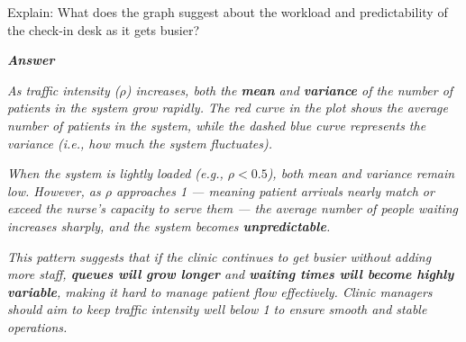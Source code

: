 \documentclass[
]{article}
\begin{document}
Explain: What does the graph suggest about the workload and
predictability of the check-in desk as it gets busier?

\textbf{\emph{Answer}}

\emph{As traffic intensity (\(\rho\)) increases, both the \textbf{mean}
and \textbf{variance} of the number of patients in the system grow
rapidly. The red curve in the plot shows the average number of patients
in the system, while the dashed blue curve represents the variance
(i.e., how much the system fluctuates).}

\emph{When the system is lightly loaded (e.g., \(\rho < 0.5\)), both
mean and variance remain low. However, as \(\rho\) approaches 1 ---
meaning patient arrivals nearly match or exceed the nurse's capacity to
serve them --- the average number of people waiting increases sharply,
and the system becomes \textbf{unpredictable}.}

\emph{This pattern suggests that if the clinic continues to get busier
without adding more staff, \textbf{queues will grow longer} and
\textbf{waiting times will become highly variable}, making it hard to
manage patient flow effectively. Clinic managers should aim to keep
traffic intensity well below 1 to ensure smooth and stable operations.}
\end{document}
